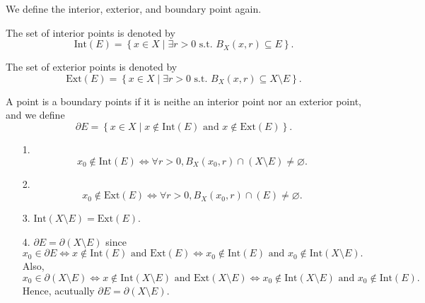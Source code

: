 \begin{definition*}
    We define the interior, exterior, and boundary point again. 
    \begin{definition}
        The set of interior points is denoted by
        \[
            \mathrm{Int} (E) = \left\{ x \in X \mid \exists r > 0 \text{ s.t. } B_X(x, r) \subseteq E \right\}.
        \] 
    \end{definition}
    \begin{definition}
       The set of exterior points is denoted by
        \[
            \mathrm{Ext} (E) = \left\{ x \in X \mid \exists r > 0 \text{ s.t. } B_X(x, r) \subseteq X \setminus E \right\}.
        \]  
    \end{definition}
    \begin{definition}
        A point is a boundary points if it is neithe an interior point nor an exterior point, and we define
        \[
            \partial E = \left\{ x \in X \mid x \notin \mathrm{Int}(E) \text{ and } x \notin \mathrm{Ext}(E) \right\}. 
        \]
    \end{definition}
\end{definition*}

\begin{remark}
    \vphantom{text}
    \begin{itemize}
        \item [1.]
        \[
            x_0 \notin \mathrm{Int} (E) \iff \forall r > 0, B_X(x_0, r) \cap (X \setminus E) \neq \varnothing.
        \]
        \item [2.]
        \[
           x_0 \notin \mathrm{Ext} (E) \iff \forall r > 0, B_X(x_0, r) \cap (E) \neq \varnothing.
        \]
        \item [3.] \(\mathrm{Int} (X \setminus E) = \mathrm{Ext} (E)\). 
        \item [4.] \(\partial E = \partial (X \setminus E) \) since 
        \[
            x_0 \in \partial E \iff x \notin \mathrm{Int}(E) \text{ and } \mathrm{Ext}(E) \iff x_0 \notin \mathrm{Int}(E) \text{ and } x_0 \notin \mathrm{Int}(X \setminus E).    
        \]  
        Also,
        \[
           x_0 \in \partial (X\setminus E) \iff x \notin \mathrm{Int}(X \setminus  E) \text{ and } \mathrm{Ext}(X \setminus E) \iff x_0 \notin \mathrm{Int}(X \setminus E) \text{ and } x_0 \notin \mathrm{Int}(E).  
        \]
        Hence, acutually \(\partial E = \partial (X \setminus E)\). 
    \end{itemize}
\end{remark}

